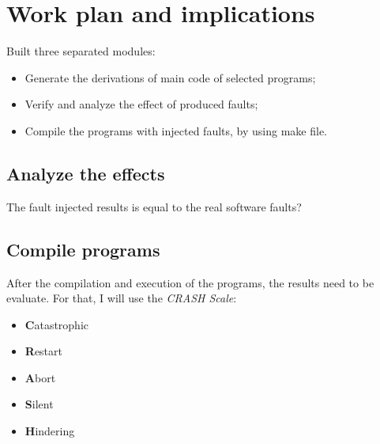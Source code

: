 \newpage
\section{Work plan and implications}




Built three separated modules:

\begin{itemize}
	\item Generate the derivations of main code of selected programs;
	\item Verify and analyze the effect of produced faults;
	\item Compile the programs with injected faults, by using make file.
\end{itemize}

\subsection{Analyze the effects}

The fault injected results is equal to the real software faults?

\subsection{Compile programs}



After the compilation and execution of the programs, the results need to be evaluate. For that, I will use the \textit{CRASH Scale}\cite{koopman1997comparing}:

\begin{itemize}
	\item \textbf{C}atastrophic
	\item \textbf{R}estart
	\item \textbf{A}bort
	\item \textbf{S}ilent
	\item \textbf{H}indering
\end{itemize}